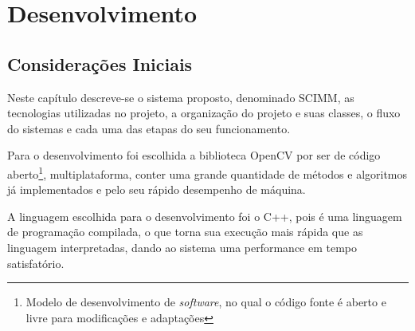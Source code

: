 	
	\chapter{Desenvolvimento} 
	\section{Considerações Iniciais}
	Neste capítulo descreve-se o sistema proposto, denominado SCIMM, as tecnologias utilizadas no projeto, a organização do projeto e suas classes, o fluxo do sistemas e cada uma das etapas do seu funcionamento.
	
	Para o desenvolvimento foi escolhida a biblioteca OpenCV por ser de código aberto\footnote{Modelo de desenvolvimento de {\it software}, no qual o código fonte é aberto e livre para modificações e adaptações}, multiplataforma, conter uma grande quantidade de métodos e algoritmos já implementados	e pelo seu rápido desempenho de máquina.
	
	A linguagem escolhida para o desenvolvimento foi o C++, pois é uma linguagem de programação compilada, o que torna sua execução mais rápida que as linguagem interpretadas, dando ao sistema uma performance em tempo satisfatório. 
			
